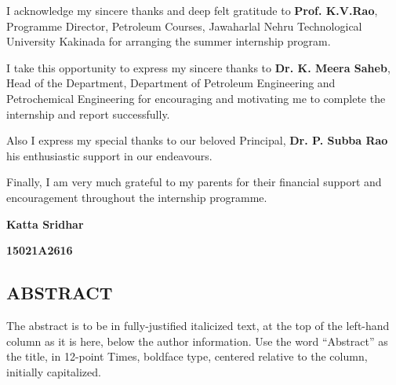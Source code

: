 \documentclass[11pt,a4paper]{report}
\begin{document}
\vspace{1em}


I acknowledge my sincere thanks and deep felt gratitude to \textbf{Prof. K.V.Rao}, Programme Director, Petroleum Courses, Jawaharlal Nehru Technological University Kakinada for arranging the summer internship program.

\vspace{1em}

I take this opportunity to express my sincere thanks to \textbf{Dr. K. Meera Saheb}, Head of the Department, Department of Petroleum Engineering and Petrochemical Engineering for encouraging and motivating me to complete the internship and report successfully.

\vspace{1em}

Also I express my special thanks to our beloved Principal, \textbf{Dr. P. Subba Rao} his enthusiastic support in our endeavours.

\vspace{1em}

Finally, I am very much grateful to my parents for their financial support and encouragement throughout the internship programme.

\vspace{1em}

\hfill \textbf{Katta Sridhar}

\hfill \textbf{15021A2616} \hspace{0.005\textwidth}
        
\newpage        
\tableofcontents



\newpage

\begin{center}
\section*{ABSTRACT}
\end{center}
  
The abstract is to be in fully-justified italicized text, at the top of the left-hand column as it is here, 
below the author information. Use the word “Abstract” as the title, in 12-point Times,
 boldface type, centered relative to the column, initially capitalized. 

  
  
\vspace{2em}
  
\end{document}
